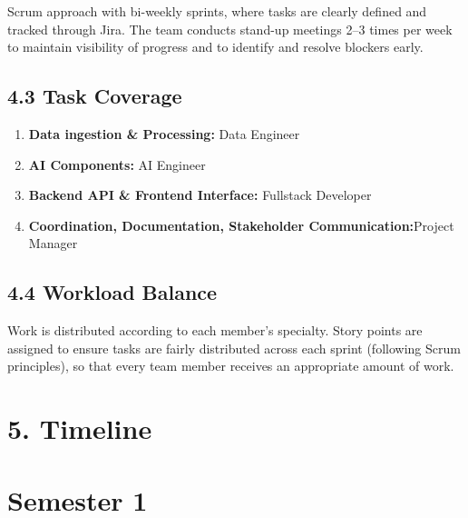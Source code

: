 \documentclass[12pt]{article}
\begin{document}
Scrum approach with bi-weekly sprints, where tasks are clearly defined
and tracked through Jira. The team conducts stand-up meetings 2--3 times
per week to maintain visibility of progress and to identify and resolve
blockers early.

\subsection{4.3 Task Coverage}\label{task-coverage}

\begin{enumerate}
\def\labelenumi{\arabic{enumi}.}
\item
  \textbf{Data ingestion \& Processing:} Data Engineer
\item
  \textbf{AI Components:} AI Engineer
\item
  \textbf{Backend API \& Frontend Interface:} Fullstack Developer
\item
  \textbf{Coordination, Documentation, Stakeholder
  Communication:}Project Manager
\end{enumerate}

\subsection{4.4 Workload Balance}\label{workload-balance}

Work is distributed according to each member's specialty. Story points
are assigned to ensure tasks are fairly distributed across each sprint
(following Scrum principles), so that every team member receives an
appropriate amount of work.

\section{}\label{section-2}

\section{5. Timeline}\label{timeline}

\section{\texorpdfstring{ Semester 1}{ Semester 1}}\label{semester-1}
\end{document}
